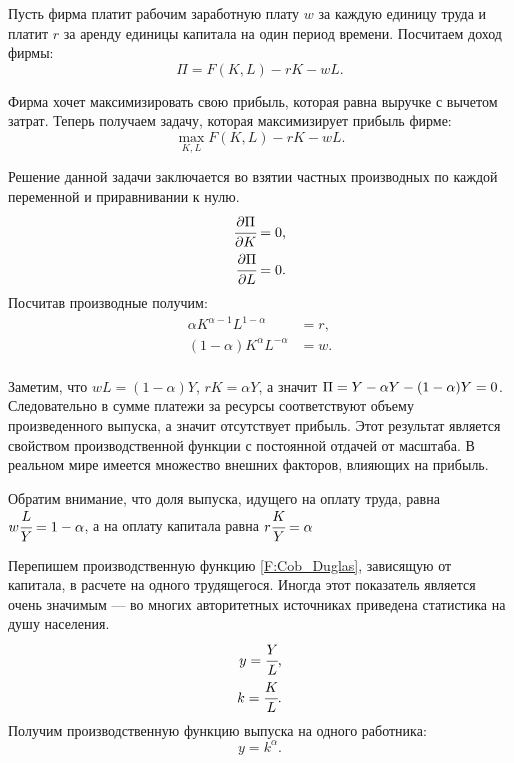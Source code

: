 Пусть фирма платит рабочим заработную плату $w$ за каждую единицу труда и платит $r$ за аренду единицы капитала на один период времени.
Посчитаем доход фирмы:
\begin{equation*}
	\Pi=F(K, L) - rK - wL\text{.}
\end{equation*}

Фирма хочет максимизировать свою прибыль, которая равна выручке с вычетом затрат.
Теперь получаем задачу, которая максимизирует прибыль фирме:
\begin{equation}
	\max\limits_{K, L} F(K,L) - rK - wL\text{.}
\end{equation}

Решение данной задачи заключается во взятии частных производных по каждой переменной и приравнивании к нулю.
\begin{align*}
	\cfrac{\partial \Pi}{\partial K} &= 0\text{,} \\
	\cfrac{\partial \Pi}{\partial L} &= 0\text{.}
\end{align*}
Посчитав производные получим:
\begin{align*}
	\alpha K^{\alpha - 1} L^{1-\alpha} &= r\text{,}\\
	(1 - \alpha) K^{\alpha} L^{-\alpha} &= w\text{.}\\
\end{align*}

Заметим, что $wL = (1-\alpha)Y$, $rK = \alpha Y$, а значит $\Pi=Y - \alpha Y - (1\hm{-} \alpha)Y = 0$.
Следовательно в сумме платежи за ресурсы соответствуют объему произведенного выпуска, а значит отсутствует прибыль.
Этот результат является свойством производственной функции с постоянной отдачей от масштаба.
В реальном мире имеется множество внешних факторов, влияющих на прибыль.

Обратим внимание, что доля выпуска, идущего на оплату труда, равна $w\cfrac{L}{Y} = 1 - \alpha$, а на оплату капитала равна $r\cfrac{K}{Y} = \alpha$

Перепишем производственную функцию \ref{F:Cob_Duglas}, зависящую от капитала, в расчете на одного трудящегося.
Иногда этот показатель является очень значимым --- во многих авторитетных источниках приведена статистика на душу населения.
\begin{align*}
y = \cfrac{Y}{L}\text{,}\\
k = \cfrac{K}{L}\text{.}
\end{align*}
Получим производственную функцию выпуска на одного работника:
\begin{equation}
	y = k^{\alpha}\text{.}
\label{F:proiz_per_worker}
\end{equation}

